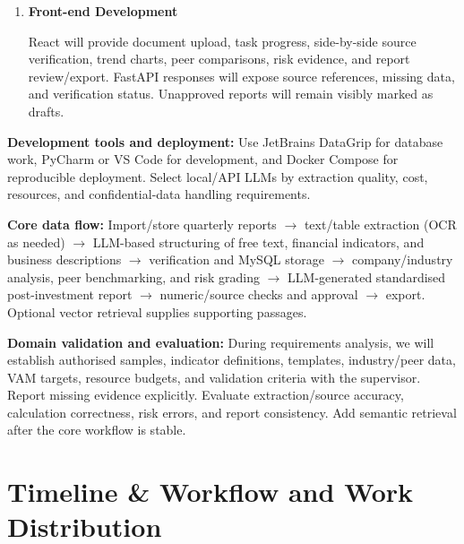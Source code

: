 \documentclass[a4paper,12pt]{article}
\begin{document}
\begin{enumerate}
  \noindent\textbf{Optional semantic retrieval.}
  BGE-M3 will support Chinese/English evidence retrieval, evaluated on
  report samples for quality and resource use. FAISS will index vectors, with chunk IDs,
  sources, and versions in MySQL. Before ranking, restrict evidence by
  company, period, access rights, and valid version. Embeddings locate
  passages; financial extraction and calculation remain separate. Keep
  index updates/backups consistent with document versions; consider Qdrant
  if filtering or concurrency needs increase.

  \item \textbf{Front-end Development}\par
  React will provide document upload, task progress, side-by-side source
  verification, trend charts, peer comparisons, risk evidence, and report
  review/export. FastAPI responses will expose source references, missing
  data, and verification status. Unapproved reports will remain visibly
  marked as drafts.
\end{enumerate}

\noindent\textbf{Development tools and deployment:}
Use JetBrains DataGrip for database work, PyCharm or VS Code for development,
and Docker Compose for reproducible deployment. Select local/API LLMs by
extraction quality, cost, resources, and confidential-data handling requirements.

\medskip
\noindent\textbf{Core data flow:}
Import/store quarterly reports $\rightarrow$ text/table extraction (OCR as needed)
$\rightarrow$ LLM-based structuring of free text, financial indicators,
and business descriptions $\rightarrow$ verification and MySQL storage
$\rightarrow$ company/industry analysis, peer benchmarking, and risk grading
$\rightarrow$ LLM-generated standardised post-investment report
$\rightarrow$ numeric/source checks and approval $\rightarrow$ export.
Optional vector retrieval supplies supporting passages.

\medskip
\noindent\textbf{Domain validation and evaluation:}
During requirements analysis, we will establish authorised samples, indicator definitions, templates, industry/peer data, VAM targets, resource budgets, and validation criteria with the supervisor.
Report missing evidence explicitly. Evaluate extraction/source accuracy,
calculation correctness, risk errors, and report consistency. Add semantic
retrieval after the core workflow is stable.

\newpage
\section{Timeline \& Workflow and Work Distribution}
\end{document}
